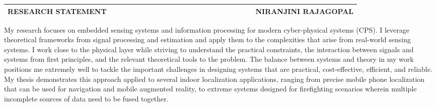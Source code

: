 \documentclass[10pt]{article}
\date{}
\begin{document}


\begin{table}
\color{blue}
\begin{tabular*}{\textwidth}{l r}
\large\textbf{RESEARCH STATEMENT} & 
\hfill \ \ \ \ \ \ \ \ \ \ \ \ \ \ \ \ \ \ \ \
\ \ \ \ \ \ \ \ \ \ \ \ \ \ \
\large\textbf{NIRANJINI RAJAGOPAL}\\
\hline
\end{tabular*}

\end{table}
 
My research focuses on embedded sensing systems and information processing for modern cyber-physical systems (CPS). 
I leverage theoretical frameworks from signal processing and estimation and apply them to the complexities that arise from real-world sensing systems. 
I work close to the physical layer while striving to understand the practical constraints, the interaction between signals and systems from first principles, and the relevant theoretical tools to the problem. 
The balance between systems and theory in my work positions me extremely well to tackle the important challenges in designing systems that are practical, cost-effective, efficient, and reliable. My thesis demonstrates this approach applied to several indoor localization applications, ranging from precise mobile phone localization that can be used for navigation and mobile augmented reality, to extreme systems designed for firefighting scenarios wherein multiple incomplete sources of data need to be fused together. 
\end{document}

